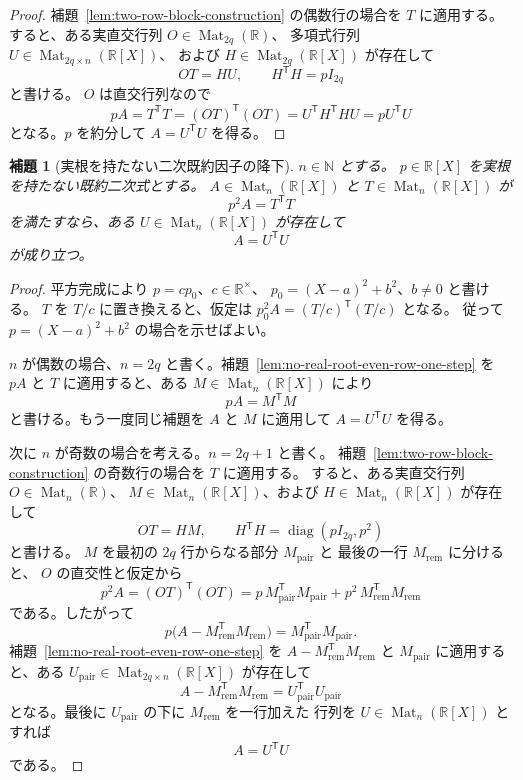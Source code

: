 \documentclass[uplatex,dvipdfmx]{jsarticle}
\newcommand{\Poly}{\mathbb{R}[X]}
\newcommand{\Mat}{\operatorname{Mat}}
\theoremstyle{matrixsosdefinition}
\newtheorem{lemma}[theorem]{補題}
\begin{document}
\begin{proof}
  補題~\ref{lem:two-row-block-construction} の偶数行の場合を \(T\) に適用する。
  すると、ある実直交行列 \(O\in\Mat_{2q}(\mathbb{R})\)、
  多項式行列 \(U\in\Mat_{2q\times n}(\Poly)\)、
  および \(H\in\Mat_{2q}(\Poly)\) が存在して
  \[
    OT=HU,\qquad H^{\mathsf T}H=pI_{2q}
  \]
  と書ける。
  \(O\) は直交行列なので
  \[
    pA=T^{\mathsf T}T
      =(OT)^{\mathsf T}(OT)
      =U^{\mathsf T}H^{\mathsf T}HU
      =pU^{\mathsf T}U
  \]
  となる。\(p\) を約分して \(A=U^{\mathsf T}U\) を得る。
\end{proof}

\begin{lemma}[実根を持たない二次既約因子の降下]
  \label{lem:no-real-root-quadratic-factor-descent}
  \(n\in\mathbb{N}\) とする。
  \(p\in\Poly\) を実根を持たない既約二次式とする。
  \(A\in\Mat_n(\Poly)\) と \(T\in\Mat_n(\Poly)\) が
  \[
    p^2A=T^{\mathsf T}T
  \]
  を満たすなら、ある \(U\in\Mat_n(\Poly)\) が存在して
  \[
    A=U^{\mathsf T}U
  \]
  が成り立つ。
\end{lemma}

\begin{proof}
  平方完成により \(p=c p_0\)、\(c\in\mathbb R^\times\)、
  \(p_0=(X-a)^2+b^2\)、\(b\ne0\) と書ける。
  \(T\) を \(T/c\) に置き換えると、仮定は
  \(p_0^2A=(T/c)^{\mathsf T}(T/c)\) となる。
  従って \(p=(X-a)^2+b^2\) の場合を示せばよい。

  \(n\) が偶数の場合、\(n=2q\) と書く。補題~\ref{lem:no-real-root-even-row-one-step} を
  \(pA\) と \(T\) に適用すると、ある \(M\in\Mat_n(\Poly)\) により
  \[
    pA=M^{\mathsf T}M
  \]
  と書ける。もう一度同じ補題を \(A\) と \(M\) に適用して
  \(A=U^{\mathsf T}U\) を得る。

  次に \(n\) が奇数の場合を考える。\(n=2q+1\) と書く。
  補題~\ref{lem:two-row-block-construction} の奇数行の場合を \(T\) に適用する。
  すると、ある実直交行列 \(O\in\Mat_n(\mathbb{R})\)、
  \(M\in\Mat_n(\Poly)\)、および \(H\in\Mat_n(\Poly)\) が存在して
  \[
    OT=HM,\qquad H^{\mathsf T}H=\operatorname{diag}(pI_{2q},p^2)
  \]
  と書ける。
  \(M\) を最初の \(2q\) 行からなる部分 \(M_{\mathrm{pair}}\) と
  最後の一行 \(M_{\mathrm{rem}}\) に分けると、
  \(O\) の直交性と仮定から
  \[
    p^2A
      =(OT)^{\mathsf T}(OT)
      =
    p\,M_{\mathrm{pair}}^{\mathsf T}M_{\mathrm{pair}}
    +p^2\,M_{\mathrm{rem}}^{\mathsf T}M_{\mathrm{rem}}
  \]
  である。したがって
  \[
    p\bigl(A-M_{\mathrm{rem}}^{\mathsf T}M_{\mathrm{rem}}\bigr)
      =
    M_{\mathrm{pair}}^{\mathsf T}M_{\mathrm{pair}}.
  \]
  補題~\ref{lem:no-real-root-even-row-one-step} を
  \(A-M_{\mathrm{rem}}^{\mathsf T}M_{\mathrm{rem}}\) と
  \(M_{\mathrm{pair}}\) に適用すると、ある
  \(U_{\mathrm{pair}}\in\Mat_{2q\times n}(\Poly)\) が存在して
  \[
    A-M_{\mathrm{rem}}^{\mathsf T}M_{\mathrm{rem}}
      =
    U_{\mathrm{pair}}^{\mathsf T}U_{\mathrm{pair}}
  \]
  となる。最後に \(U_{\mathrm{pair}}\) の下に \(M_{\mathrm{rem}}\) を一行加えた
  行列を \(U\in\Mat_n(\Poly)\) とすれば
  \[
    A=U^{\mathsf T}U
  \]
  である。
\end{proof}
\end{document}
